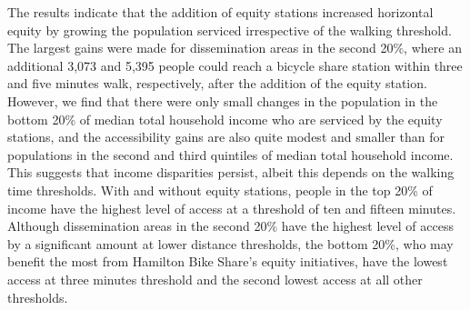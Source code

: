 \documentclass[]{elsarticle} %
\begin{document}
The results indicate that the addition of equity stations increased
horizontal equity by growing the population serviced irrespective of the
walking threshold. The largest gains were made for dissemination areas
in the second 20\%, where an additional 3,073 and 5,395 people could
reach a bicycle share station within three and five minutes walk,
respectively, after the addition of the equity station. However, we find
that there were only small changes in the population in the bottom 20\%
of median total household income who are serviced by the equity
stations, and the accessibility gains are also quite modest and smaller
than for populations in the second and third quintiles of median total
household income. This suggests that income disparities persist, albeit
this depends on the walking time thresholds. With and without equity
stations, people in the top 20\% of income have the highest level of
access at a threshold of ten and fifteen minutes. Although dissemination
areas in the second 20\% have the highest level of access by a
significant amount at lower distance thresholds, the bottom 20\%, who
may benefit the most from Hamilton Bike Share's equity initiatives, have
the lowest access at three minutes threshold and the second lowest
access at all other thresholds.
\end{document}
